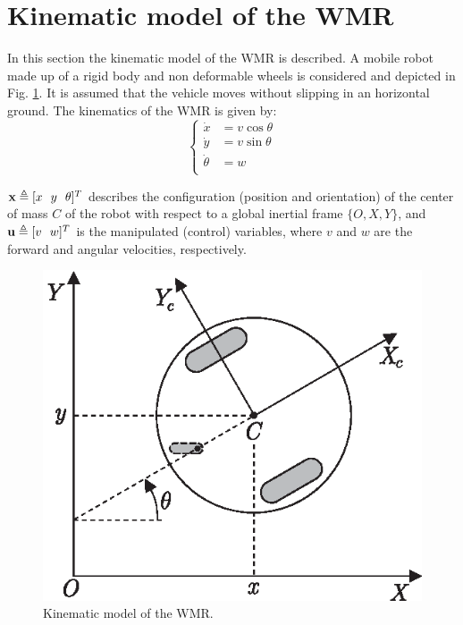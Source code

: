 \documentclass[twocolumn]{IEEEtran} %
\begin{document}
\section{Kinematic model of the WMR}\label{sec:model}
In this section the kinematic model of the WMR is described. A mobile robot made up of a rigid body and non deformable wheels is considered and depicted in Fig. \ref{fig:robot}. It is assumed that the vehicle moves without slipping in an horizontal ground. The kinematics of the WMR is given by:
\begin{equation}\label{eqn:model}
	\left\{
		\begin{aligned}
			\dot x	  &= v\cos\theta \\
			\dot y	  &= v\sin\theta \\
			\dot \theta &= w \\
		\end{aligned}
	\right.
\end{equation}

${\bf x}\triangleq[x~~y~~\theta]^T$ describes the configuration (position and orientation) of the center of mass $C$ of the robot with respect to a global inertial frame $\{O,X,Y\}$, and ${\bf u}\triangleq[v~~w]^T$ is the manipulated (control) variables, where $v$ and $w$ are the forward and angular velocities, respectively.
\begin{figure}[t]\begin{center}
    \includegraphics[width=.67\linewidth]{Figures/robot.eps}
    \caption{Kinematic model of the WMR.}
    \label{fig:robot}
\end{center}\end{figure}
\end{document}
